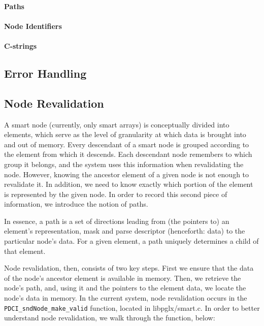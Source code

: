 \documentclass{article}
\begin{document}
\paragraph{Paths}


\paragraph{Node Identifiers}


\paragraph{C-strings}


\subsection{Error Handling}
\label{sec:error-handling}

\subsection{Node Revalidation}

  A smart node (currently, only smart arrays) is conceptually divided 
into elements, which serve as the level of granularity at which data is 
brought into and out of memory. Every descendant of a smart node is 
grouped according to the element from which it descends. Each descendant 
node remembers to which group it belongs, and the system uses this 
information when revalidating the node. However, knowing the ancestor 
element of a given node is not enough to revalidate it. In addition, we 
need to know exactly which portion of the element is represented by the 
given node. In order to record this second piece of information, we 
introduce the notion of paths.

 In essence, a path is a set of directions leading from (the pointers 
to) an element's representation, mask and parse descriptor (henceforth: 
data) to the particular node's data. For a given element, a path 
uniquely determines a child of that element.

  Node revalidation, then, consists of two key steps. First we ensure 
that the data of the node's ancestor element is available in memory. 
Then, we retrieve the node's path, and, using it and the pointers to the 
element data, we locate the node's data in memory. In the current 
system, node revalidation occurs in the \verb+PDCI_sndNode_make_valid+
function, located in libpglx/smart.c. In order to better understand node 
revalidation, we walk through the function, below:
\end{document}
